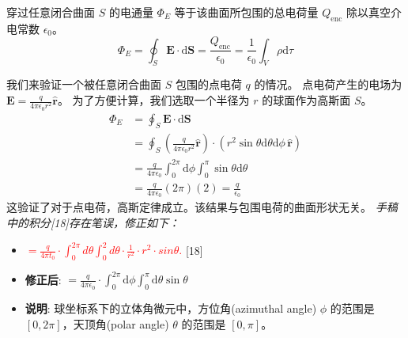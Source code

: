 \documentclass[fontset=none]{ctexart}
\begin{document}
\begin{definition}
    穿过任意闭合曲面 $S$ 的电通量 $\Phi_E$ 等于该曲面所包围的总电荷量 $Q_{\text{enc}}$ 
    除以真空介电常数 $\epsilon_0$。
    \begin{equation}
        \Phi_E = \oint_S \bm{E} \cdot \mathrm{d}\bm{S} = \frac{Q_{\text{enc}}}{\epsilon_0} = \frac{1}{\epsilon_0} \int_V \rho \mathrm{d}\tau
    \end{equation}
\end{definition}

\begin{example}[点电荷的电通量]
    我们来验证一个被任意闭合曲面 $S$ 包围的点电荷 $q$ 的情况。
    点电荷产生的电场为 $\bm{E} = \frac{q}{4\pi\epsilon_0 r^2} \hat{\bm{r}}$。
    为了方便计算，我们选取一个半径为 $r$ 的球面作为高斯面 $S$。
    \begin{equation}
    \begin{aligned}
        \Phi_E &= \oint_S \bm{E} \cdot \mathrm{d}\bm{S} \\
        &= \oint_S \left(\frac{q}{4\pi\epsilon_0 r^2} \hat{\bm{r}}\right) \cdot (r^2 \sin\theta \mathrm{d}\theta \mathrm{d}\phi \, \hat{\bm{r}}) \\
        &= \frac{q}{4\pi\epsilon_0} \int_{0}^{2\pi} \mathrm{d}\phi \int_{0}^{\pi} \sin\theta \mathrm{d}\theta \\
        &= \frac{q}{4\pi\epsilon_0} (2\pi) (2) = \frac{q}{\epsilon_0}
    \end{aligned}
    \end{equation}
    这验证了对于点电荷，高斯定律成立。该结果与包围电荷的曲面形状无关。
    \textit{手稿中的积分[18]存在笔误，修正如下：}
    \begin{itemize}
        \item \textcolor{red}{$=\frac{q}{4\pi t_{0}}\cdot\int_{0}^{2\pi}d\theta\int_{0}^{2}d\theta\cdot\frac{1}{r^{2}}\cdot r^{2}\cdot sin\theta.$} [18]
        \item \textbf{修正后}: $=\frac{q}{4\pi \epsilon_{0}}\cdot\int_{0}^{2\pi}\mathrm{d}\phi\int_{0}^{\pi}\mathrm{d}\theta \sin\theta$
        \item \textbf{说明}: 球坐标系下的立体角微元中，方位角(azimuthal angle) $\phi$ 的范围是 $[0, 2\pi]$，天顶角(polar angle) $\theta$ 的范围是 $[0, \pi]$。
    \end{itemize}
\end{example}
\end{document}
